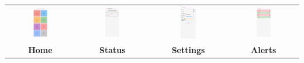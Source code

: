 \documentclass[../main]{subfiles}
\begin{document}
\begin{tabular}{cccc}
\vspace{0.5cm}
    \includegraphics[width=0.22\textwidth]{pics/app4.jpeg} &
    \includegraphics[width=0.22\textwidth]{pics/app5.jpeg} &
    \includegraphics[width=0.22\textwidth]{pics/app2.jpeg} &
    \includegraphics[width=0.22\textwidth]{pics/app6.jpeg} \\
    \textbf{Home} & \textbf{Status} & \textbf{Settings} & \textbf{Alerts} \\
\end{tabular}
\end{document}
